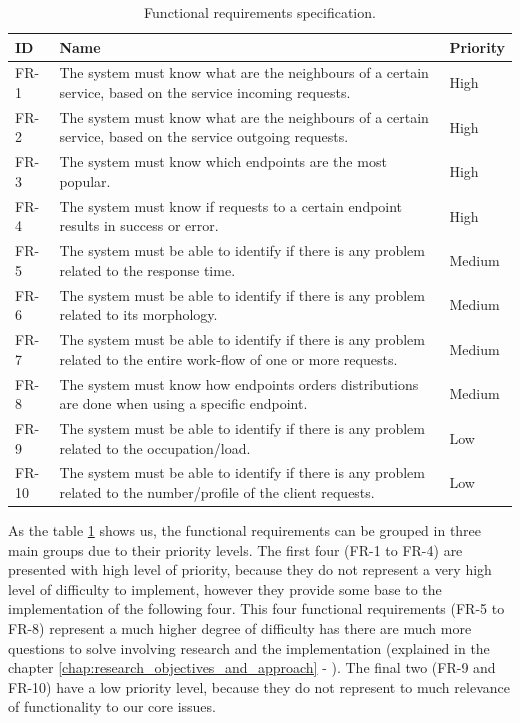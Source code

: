 \begin{table}[!ht]
\caption{Functional requirements specification.}
\label{table:functional_requirements_specification}
\begin{tabularx}{\linewidth} {
    |>{\hsize=0.4\hsize}X| 
     >{\hsize=2.2\hsize}X|
     >{\hsize=0.4\hsize}X| }
    \hline
    \textbf{ID} 
    & \textbf{Name}
    & \textbf{Priority} \\ \hline
    FR-1
    & The system must know what are the neighbours of a certain service, based on the service incoming requests.
    & High \\ \hline
    FR-2
    & The system must know what are the neighbours of a certain service, based on the service outgoing requests.
    & High \\ \hline
    FR-3
    & The system must know which endpoints are the most popular.
    & High \\ \hline
    FR-4
    & The system must know if requests to a certain endpoint results in success or error.
    & High \\ \hline
    FR-5
    & The system must be able to identify if there is any problem related to the response time.
    & Medium \\ \hline
    FR-6
    & The system must be able to identify if there is any problem related to its morphology.
    & Medium \\ \hline
    FR-7
    & The system must be able to identify if there is any problem related to the entire work-flow of one or more requests.
    & Medium \\ \hline
    FR-8
    & The system must know how endpoints orders distributions are done when using a specific endpoint.
    & Medium \\ \hline
    FR-9
    & The system must be able to identify if there is any problem related to the occupation/load.
    & Low \\ \hline
    FR-10
    & The system must be able to identify if there is any problem related to the number/profile of the client requests.
    & Low \\ \hline
\end{tabularx}
\end{table}

As the table \ref{table:functional_requirements_specification} shows us, the functional requirements can be grouped in three main groups due to their priority levels. The first four (FR-1 to FR-4) are presented with high level of priority, because they do not represent a very high level of difficulty to implement, however they provide some base to the implementation of the following four. This four functional requirements (FR-5 to FR-8) represent a much higher degree of difficulty has there are much more questions to solve involving research and the implementation (explained in the chapter \ref{chap:research_objectives_and_approach} - ). The final two (FR-9 and FR-10) have a low priority level, because they do not represent to much relevance of functionality to our core issues.


